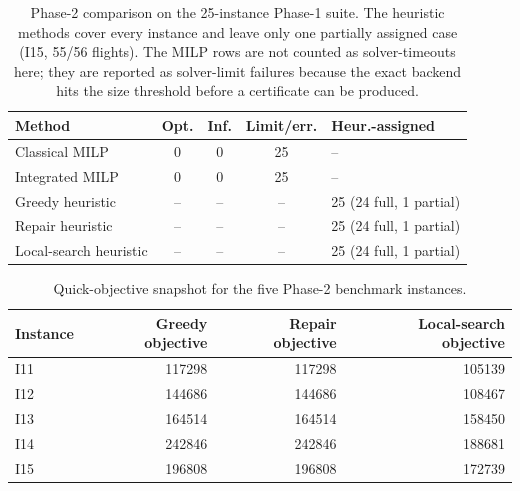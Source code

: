 \begin{table}[t]
\centering\small
\caption{Phase-2 comparison on the 25-instance Phase-1 suite.  The heuristic
  methods cover every instance and leave only one partially assigned case
  (I15, 55/56 flights).  The MILP rows are not counted as solver-timeouts here;
  they are reported as solver-limit failures because the exact backend hits the
  size threshold before a certificate can be produced.}
\label{tab:phase2_summary}
\begin{tabular}{lcccl}
\toprule
Method & Opt. & Inf. & Limit/err. & Heur.-assigned \\
\midrule
Classical MILP  & 0 & 0 & 25 & -- \\
Integrated MILP & 0 & 0 & 25 & -- \\
Greedy heuristic & -- & -- & -- & 25 (24 full, 1 partial) \\
Repair heuristic & -- & -- & -- & 25 (24 full, 1 partial) \\
Local-search heuristic & -- & -- & -- & 25 (24 full, 1 partial) \\
\bottomrule
\end{tabular}
\end{table}

\begin{table}[t]
\centering\small
\caption{Quick-objective snapshot for the five Phase-2 benchmark instances.}
\label{tab:phase2_quick_objectives}
\begin{tabular}{lrrr}
\toprule
Instance & Greedy objective & Repair objective & Local-search objective \\
\midrule
I11 & 117298 & 117298 & 105139 \\
I12 & 144686 & 144686 & 108467 \\
I13 & 164514 & 164514 & 158450 \\
I14 & 242846 & 242846 & 188681 \\
I15 & 196808 & 196808 & 172739 \\
\bottomrule
\end{tabular}
\end{table}

